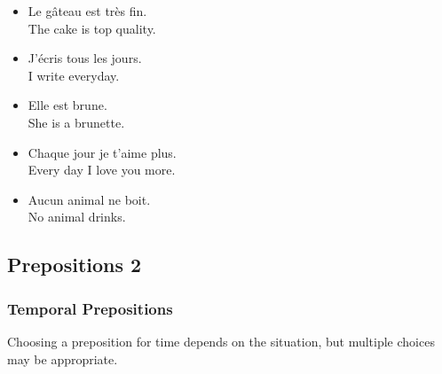 \begin{itemize}
  \item  Le g{\^a}teau est tr{\`e}s fin. \\ The cake is top quality.
  \item  J'{\'e}cris tous les jours. \\ I write everyday.
  \item  Elle est brune. \\ She is a brunette.
  \item  Chaque jour je t'aime plus. \\ Every day I love you more.
  \item  Aucun animal ne boit. \\ No animal drinks.
\end{itemize}


\pagebreak
\subsection{Prepositions 2}

\subsubsection{Temporal Prepositions}

Choosing a preposition for time depends on the situation, but multiple choices may be appropriate.

